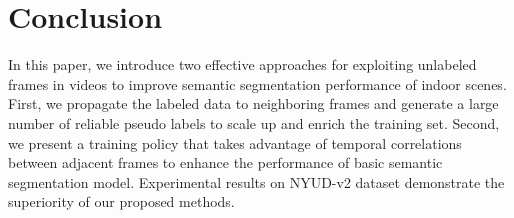 \section{Conclusion}
\label{sec:conclusion}
In this paper, we introduce two effective approaches for exploiting unlabeled frames in videos to improve semantic segmentation performance of indoor scenes. 
%
First, we propagate the labeled data to neighboring frames and generate a large number of reliable pseudo labels to scale up and enrich the training set.
%
Second, we present a training policy that takes advantage of temporal correlations between adjacent frames to enhance the performance of basic semantic segmentation model.
%
Experimental results on NYUD-v2 dataset demonstrate the superiority of our proposed methods.  
%
%

